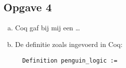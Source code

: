 \documentclass{article}
\begin{document}
\subsection*{Opgave 4}
\begin{enumerate}[a)]
 \item %
  Coq gaf bij mij een \dots
  
 \item %
  De definitie zoals ingevoerd in Coq:
  \begin{verbatim}
  Definition penguin_logic := 
  \end{verbatim}
\end{enumerate}
\end{document}
